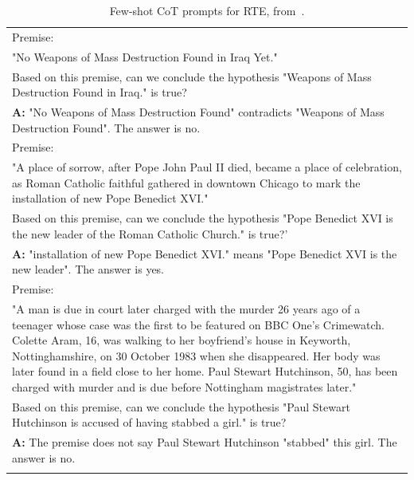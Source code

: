 \documentclass{article} %
\begin{document}
\begin{table}[h]
    \caption{
    Few-shot CoT prompts for RTE, from~\cite{Wang2022RationaleAugmentedEI}.
    }
    \centering
    \small
    \begin{tabular}{p{14cm}}
        \toprule
        Premise:\\
        "No Weapons of Mass Destruction Found in Iraq Yet."\\
        Based on this premise, can we conclude the hypothesis "Weapons of Mass Destruction Found in Iraq." is true?\\
        \vspace{-1mm}
        \textbf{A:} "No Weapons of Mass Destruction Found" contradicts "Weapons of Mass Destruction Found". The answer is no.\\
        \vspace{0mm}
        Premise:\\
        "A place of sorrow, after Pope John Paul II died, became a place of celebration, as Roman Catholic faithful gathered in downtown Chicago to mark the installation of new Pope Benedict XVI."\\
        Based on this premise, can we conclude the hypothesis "Pope Benedict XVI is the new leader of the Roman Catholic Church." is true?'\\
        \vspace{-1mm}
        \textbf{A:} "installation of new Pope Benedict XVI." means "Pope Benedict XVI is the new leader". The answer is yes. \\
        \vspace{0mm}
        Premise:\\
        "A man is due in court later charged with the murder 26 years ago of a teenager whose case was the first to be featured on BBC One's Crimewatch. Colette Aram, 16, was walking to her boyfriend's house in Keyworth, Nottinghamshire, on 30 October 1983 when she disappeared. Her body was later found in a field close to her home. Paul Stewart Hutchinson, 50, has been charged with murder and is due before Nottingham magistrates later."\\
        Based on this premise, can we conclude the hypothesis "Paul Stewart Hutchinson is accused of having stabbed a girl." is true?\\
        \vspace{-1mm}
        \textbf{A:} The premise does not say Paul Stewart Hutchinson "stabbed" this girl. The answer is no.\\
        \vspace{0mm}

\end{tabular}
\end{table}
\end{document}
